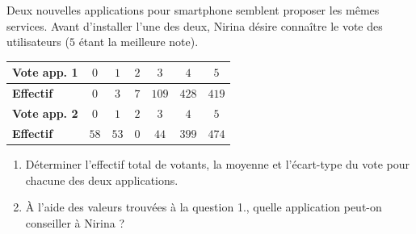 \begin{exo}
	Deux nouvelles applications pour smartphone semblent proposer les mêmes services. Avant d'installer l'une des deux, Nirina désire connaître le vote des utilisateurs ($5$ étant la meilleure note).

	\vspace*{2mm}
	\def\arraystretch{1.5}
	\begin{tabular}{|l|c|c|c|c|c|c|}
		\hline
		\textbf{Vote app. 1} & $0$  & $1$  & $2$ & $3$   & $4$   & $5$   \\ \hline
		\textbf{Effectif}    & $0$  & $3$  & $7$ & $109$ & $428$ & $419$ \\ \hline \hline
		\textbf{Vote app. 2} & $0$  & $1$  & $2$ & $3$   & $4$   & $5$   \\ \hline
		\textbf{Effectif}    & $58$ & $53$ & $0$ & $44$  & $399$ & $474$ \\ \hline
	\end{tabular}
	\vspace*{2mm}
	\begin{enumerate}
		\item Déterminer l'effectif total de votants, la moyenne et l'écart-type du vote pour chacune des deux applications.
		\item À l'aide des valeurs trouvées à la question 1., quelle application peut-on conseiller à Nirina ?
	\end{enumerate}
\end{exo}
